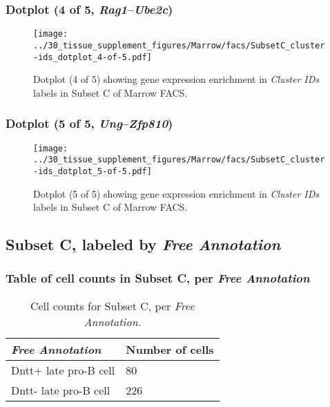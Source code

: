 \clearpage

\subsubsection{Dotplot (4 of 5, \emph{Rag1}--\emph{Ube2c})}
\begin{figure}[h]
\centering
\texttt{[image: ../30\_tissue\_supplement\_figures/Marrow/facs/SubsetC\_cluster-ids\_dotplot\_4-of-5.pdf]}

\caption{ Dotplot (4 of 5)  showing gene expression enrichment in \emph{Cluster IDs} labels in Subset C of Marrow FACS. }
\end{figure}


\clearpage

\subsubsection{Dotplot (5 of 5, \emph{Ung}--\emph{Zfp810})}
\begin{figure}[h]
\centering
\texttt{[image: ../30\_tissue\_supplement\_figures/Marrow/facs/SubsetC\_cluster-ids\_dotplot\_5-of-5.pdf]}

\caption{ Dotplot (5 of 5)  showing gene expression enrichment in \emph{Cluster IDs} labels in Subset C of Marrow FACS. }
\end{figure}


\clearpage

\subsection{Subset C, labeled by \emph{Free Annotation}}
\subsubsection{Table of cell counts in Subset C, per \emph{Free Annotation}}\begin{table}[h]
\centering
\label{my-label}
\begin{tabular}{@{}ll@{}}
\toprule

\emph{Free Annotation}& Number of cells \\ \midrule
Dntt+ late pro-B cell & 80 \\

Dntt- late pro-B cell & 226 \\
\bottomrule
\end{tabular}
\caption{Cell counts for Subset C, per \emph{Free Annotation}.}
\end{table}

